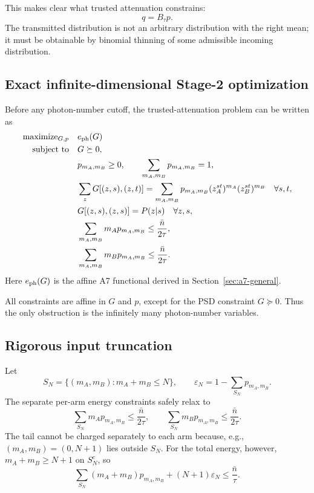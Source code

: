 \documentclass[11pt]{article}
\theoremstyle{remark}
\begin{document}
This makes clear what trusted attenuation constrains:
\[
    q=B_\tau p.
\]
The transmitted distribution is not an arbitrary distribution with the right
mean; it must be obtainable by binomial thinning of some admissible incoming
distribution.

\subsection{Exact infinite-dimensional Stage-2 optimization}

Before any photon-number cutoff, the trusted-attenuation problem can be
written as
\begin{equation}
\begin{aligned}
    \text{maximize}_{G,p}\quad&
    e_{\rm ph}(G)
    \\
    \text{subject to}\quad&
    G\succeq0,
    \\
    &p_{m_A,m_B}\ge0,
    \qquad
    \sum_{m_A,m_B}p_{m_A,m_B}=1,
    \\
    &\sum_zG[(z,s),(z,t)]
    =
    \sum_{m_A,m_B}
      p_{m_A,m_B}
      (z_A^{st})^{m_A}(z_B^{st})^{m_B}
    \quad\forall s,t,
    \\
    &G[(z,s),(z,s)]
    =
    P(z|s)
    \quad\forall z,s,
    \\
    &\sum_{m_A,m_B}
      m_Ap_{m_A,m_B}
    \le
    \frac{\bar n}{2\tau},
    \\
    &\sum_{m_A,m_B}
      m_Bp_{m_A,m_B}
    \le
    \frac{\bar n}{2\tau}.
\end{aligned}
    \label{eq:stage2-exact-optimization}
\end{equation}
Here \(e_{\rm ph}(G)\) is the affine A7 functional derived in
Section~\ref{sec:a7-general}.

All constraints are affine in \(G\) and \(p\), except for the PSD constraint
\(G\succeq0\).  Thus the only obstruction is the infinitely many
photon-number variables.

\subsection{Rigorous input truncation}

Let
\[
    S_N=\{(m_A,m_B):m_A+m_B\le N\},
\qquad
    \varepsilon_N
    =
    1-\sum_{S_N}p_{m_A,m_B}.
\]
The separate per-arm energy constraints safely relax to
\begin{equation}
    \sum_{S_N}m_Ap_{m_A,m_B}
    \le\frac{\bar n}{2\tau},
    \qquad
    \sum_{S_N}m_Bp_{m_A,m_B}
    \le\frac{\bar n}{2\tau}.
    \label{eq:stage2-perarm-energy}
\end{equation}
The tail cannot be charged separately to each arm because, e.g.,
\((m_A,m_B)=(0,N+1)\) lies outside \(S_N\).  For the total energy, however,
\(m_A+m_B\ge N+1\) on \(S_N^c\), so
\begin{equation}
    \sum_{S_N}
      (m_A+m_B)p_{m_A,m_B}
    +(N+1)\varepsilon_N
    \le
    \frac{\bar n}{\tau}.
    \label{eq:stage2-combined-energy}
\end{equation}
\end{document}
